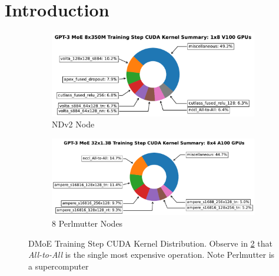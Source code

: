 
\section{Introduction}\label{sec:introduction}
\begin{figure}[!h]
    \begin{subfigure}{.5\linewidth}
        \centering
        \includegraphics[width=\linewidth]{images/single_trace_1x8_donut}
        \caption{NDv2 Node}
        \label{singlepie}
    \end{subfigure}\hfill %
    \begin{subfigure}{.5\linewidth}
        \centering
        \includegraphics[width=\linewidth]{images/multi_sum_8x4_1.3B_donut}
        \caption{8 Perlmutter Nodes}
        \label{multi_1.3B_pie}
    \end{subfigure}
    \caption{\footnotesize DMoE Training Step CUDA Kernel Distribution.
    Observe in \ref{multi_1.3B_pie} that \emph{All-to-All} is the single most expensive operation.
    Note Perlmutter is a supercomputer}
    \label{fig:donut}
\end{figure}

